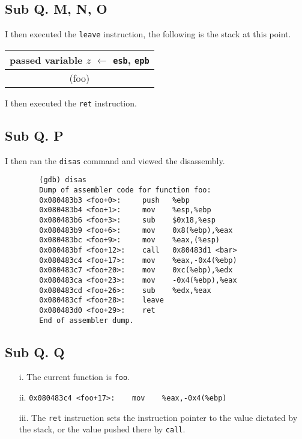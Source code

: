 \documentclass[letterpaper, 10pt]{article}
\begin{document}
	\subsection*{Sub Q. M, N, O}

	I then executed the {\tt leave} instruction, the following is the stack at this point.

	\vspace{1em}
	\begin{tabular} { | c | }
		passed variable $z$ $\longleftarrow$ {\tt esb}, {\tt epb} \\
		\hline \hline
		(foo) \\
	\end{tabular}
	\vspace{1em}

	I then executed the {\tt ret} instruction.

	\subsection*{Sub Q. P}

	I then ran the {\tt disas} command and viewed the disassembly.

	\begin{verbatim}
		(gdb) disas
		Dump of assembler code for function foo:
		0x080483b3 <foo+0>:     push   %ebp
		0x080483b4 <foo+1>:     mov    %esp,%ebp
		0x080483b6 <foo+3>:     sub    $0x18,%esp
		0x080483b9 <foo+6>:     mov    0x8(%ebp),%eax
		0x080483bc <foo+9>:     mov    %eax,(%esp)
		0x080483bf <foo+12>:    call   0x80483d1 <bar>
		0x080483c4 <foo+17>:    mov    %eax,-0x4(%ebp)
		0x080483c7 <foo+20>:    mov    0xc(%ebp),%edx
		0x080483ca <foo+23>:    mov    -0x4(%ebp),%eax
		0x080483cd <foo+26>:    sub    %edx,%eax
		0x080483cf <foo+28>:    leave
		0x080483d0 <foo+29>:    ret
		End of assembler dump.
	\end{verbatim}

	\subsection*{Sub Q. Q}

	\begin{itemize}
		\item[i.] The current function is {\tt foo}.
		\item[ii.] \verb!0x080483c4 <foo+17>:    mov    %eax,-0x4(%ebp)!
		\item[iii.] The {\tt ret} instruction sets the instruction pointer to the value dictated by the stack, or the value pushed there by {\tt call}.
	\end{itemize}
\end{document}
